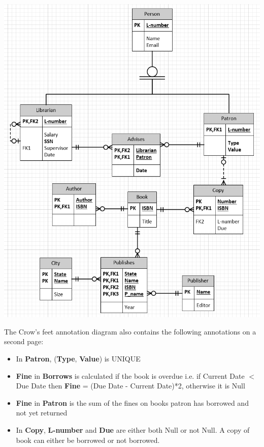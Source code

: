 \documentclass[11pt]{article}
\begin{document}
\begin{center}
    \includegraphics[width=150mm]{solution.jpg}
\end{center}
The Crow's feet annotation diagram also contains the following annotations on a second page:
\begin{itemize}
    \item In \textbf{Patron}, (\textbf{Type}, \textbf{Value}) is UNIQUE
    \item \textbf{Fine} in \textbf{Borrows} is calculated if the book is overdue i.e. if Current Date $<$ Due Date then \textbf{Fine} = (Due Date - Current Date)*2, otherwise it is Null
    \item \textbf{Fine} in \textbf{Patron} is the sum of the fines on books patron has borrowed and not yet returned
    \item In \textbf{Copy}, \textbf{L-number} and \textbf{Due} are either both Null or not Null. A copy of book can either be borrowed or not borrowed.
\end{itemize}
\end{document}
